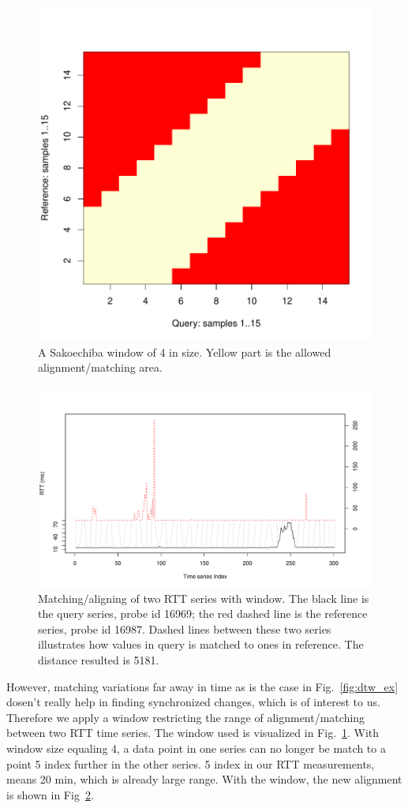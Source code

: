 \begin{figure}[!htb]
\centering
\includegraphics[width=.5\textwidth]{gfx/chap3/win.pdf}
\caption{A Sakoechiba  window \cite{Sakoe1978} of 4 in size. Yellow part is the allowed alignment/matching area.}
\label{fig:win}
\end{figure}

\begin{figure}[!htb]
\centering
\includegraphics[width=.8\textwidth]{gfx/chap3/dtw_ex_win.pdf}
\caption{Matching/aligning of two RTT series with window. The black line is the query series, probe id 16969; the red dashed line is the reference series, probe id 16987. Dashed lines between these two series illustrates how values in query is matched to ones in reference. The distance resulted is 5181.}
\label{fig:dtw_ex_win}
\end{figure}

However, matching variations far away in time as is the case in Fig.~\ref{fig:dtw_ex} dosen't really help in finding synchronized changes, which is of interest to us. Therefore we apply a window restricting the range of alignment/matching between two RTT time series. The window used is visualized in Fig.~\ref{fig:win}. With window size equaling 4, a data point in one series can no longer be match to a point 5 index further in the other series. 5 index in our RTT measurements, means 20 min, which is already large range. With the window, the new alignment is shown in Fig~\ref{fig:dtw_ex_win}.

